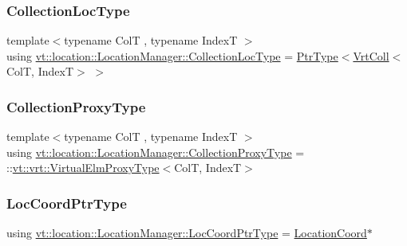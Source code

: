 \subsubsection{\texorpdfstring{Collection\+Loc\+Type}{CollectionLocType}}
{\footnotesize\ttfamily template$<$typename ColT , typename IndexT $>$ \\
using \hyperlink{structvt_1_1location_1_1_location_manager_aa4b146a9cf55cf5ec92b2b0f5e6d7cf4}{vt\+::location\+::\+Location\+Manager\+::\+Collection\+Loc\+Type} =  \hyperlink{structvt_1_1location_1_1_location_manager_a32d8bca6ed6909a2190286408335d3b4}{Ptr\+Type}$<$\hyperlink{structvt_1_1location_1_1_location_manager_a189fc3b436520c19aada9623a6b4a42e}{Vrt\+Coll}$<$ColT, IndexT$>$ $>$}

\mbox{\label{structvt_1_1location_1_1_location_manager_add8d70c599ff0f03bc7a0d7eaed249d0}} 
\subsubsection{\texorpdfstring{Collection\+Proxy\+Type}{CollectionProxyType}}
{\footnotesize\ttfamily template$<$typename ColT , typename IndexT $>$ \\
using \hyperlink{structvt_1_1location_1_1_location_manager_add8d70c599ff0f03bc7a0d7eaed249d0}{vt\+::location\+::\+Location\+Manager\+::\+Collection\+Proxy\+Type} =  \+::\hyperlink{namespacevt_1_1vrt_a620a5c8c59d13e513f690c74b4af516f}{vt\+::vrt\+::\+Virtual\+Elm\+Proxy\+Type}$<$ColT, IndexT$>$}

\mbox{\label{structvt_1_1location_1_1_location_manager_a98ed824c058080e538546fc731cb8f4c}} 
\subsubsection{\texorpdfstring{Loc\+Coord\+Ptr\+Type}{LocCoordPtrType}}
{\footnotesize\ttfamily using \hyperlink{structvt_1_1location_1_1_location_manager_a98ed824c058080e538546fc731cb8f4c}{vt\+::location\+::\+Location\+Manager\+::\+Loc\+Coord\+Ptr\+Type} =  \hyperlink{structvt_1_1location_1_1_location_coord}{Location\+Coord}$\ast$}

